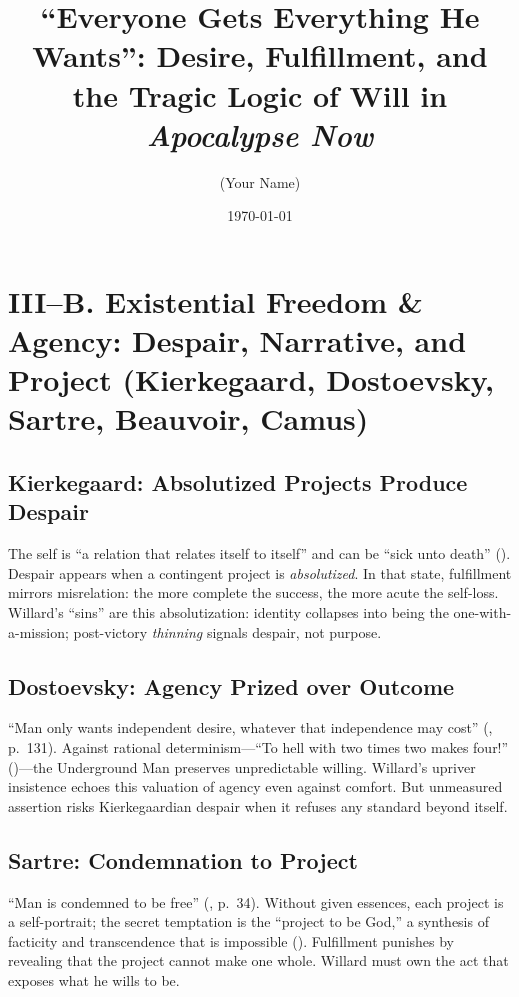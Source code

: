 \documentclass[12pt]{article}
\title{“Everyone Gets Everything He Wants”: Desire, Fulfillment, and the Tragic Logic of Will in \textit{Apocalypse Now}}
\author{(Your Name)}
\date{\today}
\begin{document}
\maketitle

\section*{III–B. Existential Freedom \& Agency: Despair, Narrative, and Project (Kierkegaard, Dostoevsky, Sartre, Beauvoir, Camus)}

\subsection*{Kierkegaard: Absolutized Projects Produce Despair}
The self is “a relation that relates itself to itself” and can be “sick unto death” (\parencite[pp.~49--52]{KierkegaardSUD1980}). Despair appears when a contingent project is \emph{absolutized}. In that state, fulfillment mirrors misrelation: the more complete the success, the more acute the self-loss. Willard’s “sins” are this absolutization: identity collapses into being the one-with-a-mission; post-victory \emph{thinning} signals despair, not purpose.

\subsection*{Dostoevsky: Agency Prized over Outcome}
“Man only wants independent desire, whatever that independence may cost” (\parencite{DostoevskyNFU1994}, p.~131). Against rational determinism—“To hell with two times two makes four!” (\parencite[p.~129]{DostoevskyNFU1994})—the Underground Man preserves unpredictable willing. Willard’s upriver insistence echoes this valuation of agency even against comfort. But unmeasured assertion risks Kierkegaardian despair when it refuses any standard beyond itself.

\subsection*{Sartre: Condemnation to Project}
“Man is condemned to be free” (\parencite{SartreBN2003}, p.~34). Without given essences, each project is a self-portrait; the secret temptation is the “project to be God,” a synthesis of facticity and transcendence that is impossible (\parencite[p.~604]{SartreBN2003}). Fulfillment punishes by revealing that the project cannot make one whole. Willard must own the act that exposes what he wills to be.
\end{document}
